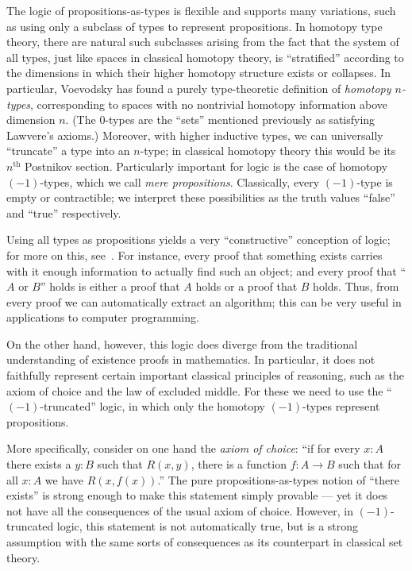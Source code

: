 The logic of propositions-as-types is flexible and supports many variations, such as using only a subclass of types to represent propositions.
In homotopy type theory, there are natural such subclasses arising from the fact that the system of all types, just like spaces in classical homotopy theory, is ``stratified'' according to the dimensions in which their higher homotopy structure exists or collapses.
In particular, Voevodsky has found a purely type-theoretic definition of \emph{homotopy $n$-types}, corresponding to spaces with no nontrivial homotopy information above dimension $n$.
(The $0$-types are the ``sets'' mentioned previously as satisfying Lawvere's axioms.)
Moreover, with higher inductive types, we can universally ``truncate'' a type into an $n$-type; in classical homotopy theory this would be its $n^{\mathrm{th}}$ Postnikov section.
Particularly important for logic is the case of homotopy $(-1)$-types, which we call \emph{mere propositions}.
Classically, every $(-1)$-type is empty or contractible; we interpret these possibilities as the truth values ``false'' and ``true'' respectively.

Using all types as propositions yields a very ``constructive'' conception of logic; for more on this, see~\cite{kolmogorov,TroelstraI,TroelstraII}.
For instance, every proof that something exists carries with it enough information to actually find such an object; and every proof that ``$A$ or $B$'' holds is either a proof that $A$ holds or a proof that $B$ holds.
Thus, from every proof we can automatically extract an algorithm;  this can be very useful in applications to computer programming.

On the other hand, however, this logic does diverge from the traditional understanding of existence proofs in mathematics.
In particular, it does not faithfully represent certain important classical principles of reasoning, such as the axiom of choice and the law of excluded middle.
For these we need to use the ``$(-1)$-truncated'' logic, in which only the homotopy $(-1)$-types represent propositions.

%
More specifically, consider on one hand the \emph{axiom of choice}: ``if for every $x: A$ there exists a $y:B$ such that $R(x,y)$, there is a function $f : A\to B$ such that for all $x:A$ we have $R(x, f(x))$.''
The pure propositions-as-types notion of ``there exists'' is strong enough to make this statement simply provable --- yet it does not have all the consequences of the usual axiom of choice.
However, in $(-1)$-truncated logic, this statement is not automatically true, but is a strong assumption with the same sorts of consequences as its counterpart in classical set theory.

